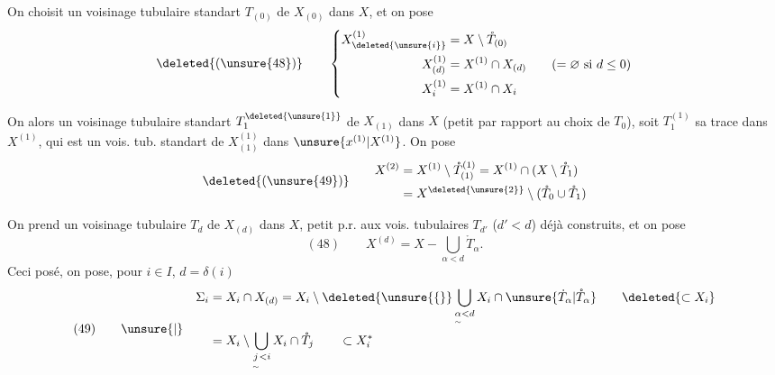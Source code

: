 On choisit un voisinage tubulaire standart $T_{(0)}$ de
$X_{(0)}$ dans $X$, et on pose
\[
\deleted{(\unsure{48})}\qquad
\left\{\begin{aligned}
X^{(1)}_{\deleted{\unsure{i}}}&=X\setminus\mathring T_{(0)}\\
X^{(1)}_{(d)}&=X^{(1)}\cap X_{(d)}\qquad(=\varnothing\text{ si }d\leq0)\\
X^{(1)}_i&=X^{(1)}\cap X_i
\end{aligned}\right.
\]

On  alors un voisinage tubulaire
standart  $T_1^{\deleted{\unsure{1}}}$ de $X_{(1)}$ dans $X$
(petit par rapport au choix de $T_0$), soit $T_1^{(1)}$ sa trace dans
$X^{(1)}$, qui est un vois. tub. standart de $X^{(1)}_{(1)}$ dans
$\unsure{x^{(1)}|X^{(1)}}$. On pose
\[
\deleted{(\unsure{49})}\qquad
\begin{aligned}
X^{(2)}&=X^{(1)}\setminus\mathring T^{(1)}_{(1)}
=X^{(1)}\cap(X\setminus\mathring T_1)\\
&=X^{\deleted{\unsure{2}}}\setminus(\mathring T_0\cup\mathring T_1)
\end{aligned}
\]

On prend un voisinage tubulaire $T_d$ de $X_{(d)}$ dans $X$,
petit p.r. aux vois. tubulaires $T_{d'}$ ($d'<d$) déjà construits,
et on pose
\[
(48)\qquad X^{(d)}=X-\bigcup_{\alpha<d}\mathring T_\alpha.
\]
Ceci posé, on pose, pour $i\in I$, $d=\delta(i)$
\[
(49)\qquad\unsure{|}\quad
\begin{aligned}
\Sigma_i&=X_i\cap X_{(d)}
=X_i\setminus\deleted{\unsure{\{}}\bigcup_{\underset{\sim}{\alpha}<d}X_i\cap
\unsure{\dot T_\alpha|\mathring T_\alpha}
\qquad\deleted{\subset X_i}\\
&=X_i\setminus\bigcup_{\underset{\sim}{j}<i}X_i\cap\mathring T_j
\qquad\subset X_i^*
\end{aligned}
\]
